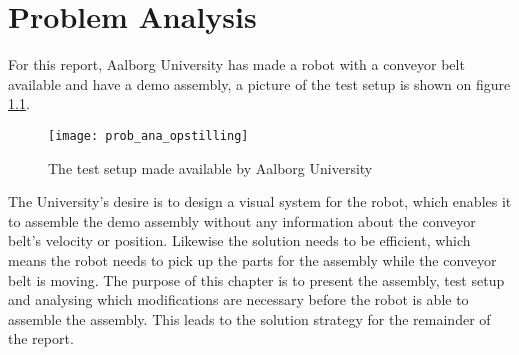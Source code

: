 \chapter{Problem Analysis}\label{sec_problem_analysis}
For this report, Aalborg University has made a robot with a conveyor belt available and have a demo assembly, a picture of the test setup is shown on figure \ref{fig_pic_test_setup}.
\begin{figure}[htbp]
\centering
\texttt{[image: prob\_ana\_opstilling]}
\caption{The test setup made available by Aalborg University}
\label{fig_pic_test_setup}
\end{figure}\newline
The University's desire is to design a visual system for the robot, which enables it to assemble the demo assembly without any information about the conveyor belt's velocity or position. Likewise the solution needs to be efficient, which means the robot needs to pick up the parts for the assembly while the conveyor belt is moving. The purpose of this chapter is to present the assembly, test setup and analysing which modifications are necessary before the robot is able to assemble the assembly. This leads to the solution strategy for the remainder of the report. 
